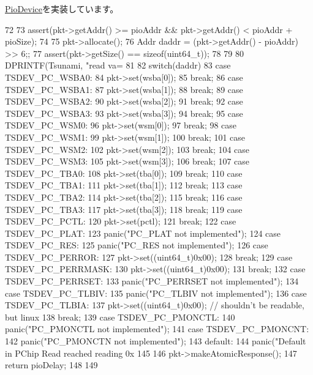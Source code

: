 \hyperlink{classPioDevice_a842312590432036092c422c87a442358}{PioDevice}を実装しています。


\begin{DoxyCode}
72 {
73     assert(pkt->getAddr() >= pioAddr && pkt->getAddr() < pioAddr + pioSize);
74 
75     pkt->allocate();
76     Addr daddr = (pkt->getAddr() - pioAddr) >> 6;;
77     assert(pkt->getSize() == sizeof(uint64_t));
78 
79 
80     DPRINTF(Tsunami, "read  va=%
81 
82     switch(daddr) {
83       case TSDEV_PC_WSBA0:
84             pkt->set(wsba[0]);
85             break;
86       case TSDEV_PC_WSBA1:
87             pkt->set(wsba[1]);
88             break;
89       case TSDEV_PC_WSBA2:
90             pkt->set(wsba[2]);
91             break;
92       case TSDEV_PC_WSBA3:
93             pkt->set(wsba[3]);
94             break;
95       case TSDEV_PC_WSM0:
96             pkt->set(wsm[0]);
97             break;
98       case TSDEV_PC_WSM1:
99             pkt->set(wsm[1]);
100             break;
101       case TSDEV_PC_WSM2:
102             pkt->set(wsm[2]);
103             break;
104       case TSDEV_PC_WSM3:
105             pkt->set(wsm[3]);
106             break;
107       case TSDEV_PC_TBA0:
108             pkt->set(tba[0]);
109             break;
110       case TSDEV_PC_TBA1:
111             pkt->set(tba[1]);
112             break;
113       case TSDEV_PC_TBA2:
114             pkt->set(tba[2]);
115             break;
116       case TSDEV_PC_TBA3:
117             pkt->set(tba[3]);
118             break;
119       case TSDEV_PC_PCTL:
120             pkt->set(pctl);
121             break;
122       case TSDEV_PC_PLAT:
123             panic("PC_PLAT not implemented\n");
124       case TSDEV_PC_RES:
125             panic("PC_RES not implemented\n");
126       case TSDEV_PC_PERROR:
127             pkt->set((uint64_t)0x00);
128             break;
129       case TSDEV_PC_PERRMASK:
130             pkt->set((uint64_t)0x00);
131             break;
132       case TSDEV_PC_PERRSET:
133             panic("PC_PERRSET not implemented\n");
134       case TSDEV_PC_TLBIV:
135             panic("PC_TLBIV not implemented\n");
136       case TSDEV_PC_TLBIA:
137             pkt->set((uint64_t)0x00); // shouldn't be readable, but linux
138             break;
139       case TSDEV_PC_PMONCTL:
140             panic("PC_PMONCTL not implemented\n");
141       case TSDEV_PC_PMONCNT:
142             panic("PC_PMONCTN not implemented\n");
143       default:
144           panic("Default in PChip Read reached reading 0x%
145     }
146     pkt->makeAtomicResponse();
147     return pioDelay;
148 
149 }
\end{DoxyCode}
